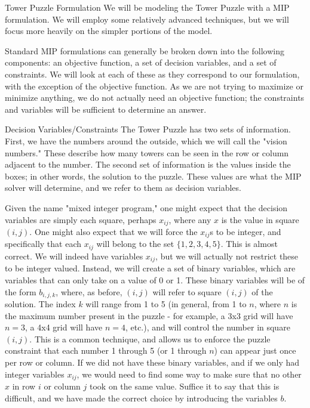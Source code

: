 \documentclass[12pt]{article}
\begin{document}
\begin{section}{Tower Puzzle Formulation}
We will be modeling the Tower Puzzle with a MIP formulation. We will employ some relatively advanced techniques, but we will focus more heavily on the simpler portions of the model.

Standard MIP formulations can generally be broken down into the following components: an objective function, a set of decision variables, and a set of constraints. We will look at each of these as they correspond to our formulation, with the exception of the objective function. As we are not trying to maximize or minimize anything, we do not actually need an objective function; the constraints and variables will be sufficient to determine an answer.
\begin{subsection}{Decision Variables/Constraints}
The Tower Puzzle has two sets of information. First, we have the numbers around the outside, which we will call the "vision numbers." These describe how many towers can be seen in the row or column adjacent to the number. The second set of information is the values inside the boxes; in other words, the solution to the puzzle. These values are what the MIP solver will determine, and we refer to them as decision variables. 

Given the name "mixed integer program," one might expect that the decision variables are simply each square, perhaps $x_{ij}$, where any $x$ is the value in square $(i,j)$. One might also expect that we will force the $x_{ij}$s to be integer, and specifically that each $x_{ij}$ will belong to the set $\{1,2,3,4,5\}$. This is almost correct. We will indeed have variables $x_{ij}$, but we will actually not restrict these to be integer valued. Instead, we will create a set of binary variables, which are variables that can only take on a value of 0 or 1. These binary variables will be of the form $b_{i,j,k}$, where, as before, $(i,j)$ will refer to square $(i,j)$ of the solution. The index $k$ will range from 1 to 5 (in general, from 1 to $n$, where $n$ is the maximum number present in the puzzle - for example, a 3x3 grid will have $n=3$, a 4x4 grid will have $n=4$, etc.), and will control the number in square $(i,j)$. This is a common technique, and allows us to enforce the puzzle constraint that each number 1 through 5 (or 1 through $n$) can appear just once per row or column. If we did not have these binary variables, and if we only had integer variables $x_{ij}$, we would need to find some way to make sure that no other $x$ in row $i$ or column $j$ took on the same value. Suffice it to say that this is difficult, and we have made the correct choice by introducing the variables $b$.


\end{subsection}
\end{section}
\end{document}

